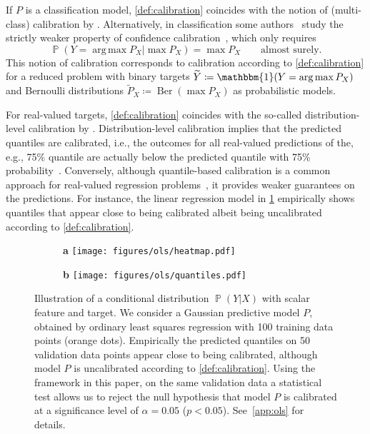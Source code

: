 \documentclass{article}
\DeclareMathOperator{\Prob}{\mathbb{P}}
\DeclareMathOperator{\Ber}{Ber}
\DeclareMathOperator{\argmax}{arg\,max}
\begin{document}
If $P$ is a classification model, \cref{def:calibration} coincides
with the notion of (multi-class) calibration by
\citet{Broecker2009,Vaicenavicius2019,Kull2019}. Alternatively, in classification
some authors~\citep{Naeini2015,Guo2017,Kumar2018} study the
strictly weaker property of confidence calibration~\citep{Kull2019},
which only requires
\begin{equation}\label{eq:calibration_confidence}
    \Prob{(Y = \argmax{P_X} | \max P_X)} = \max P_X \qquad \text{almost surely}.
\end{equation}
This notion of calibration corresponds to calibration according to \cref{def:calibration}
for a reduced problem with binary targets
$\widetilde{Y} \coloneqq \mathbbm{1}(Y = \argmax{P_X})$ and Bernoulli
distributions $\widetilde{P}_X \coloneqq \Ber(\max P_X)$ as probabilistic models.

For real-valued targets, \cref{def:calibration} coincides with the
so-called distribution-level calibration by \citet{Song2019}.
Distribution-level calibration
implies that the predicted quantiles are calibrated, i.e., the outcomes for all
real-valued predictions of the, e.g., 75\% quantile are actually below the
predicted quantile with 75\% probability~\citep[Theorem~1]{Song2019}. Conversely,
although quantile-based calibration is a
common approach for real-valued regression
problems~\citep{Ho2005,Fasiolo2020,Rueda2006,Taillardat2016,Kuleshov2018},
it provides weaker guarantees on the predictions. For instance, the
linear regression model in \cref{fig:ols_motivation} empirically shows quantiles that
appear close to being calibrated albeit being uncalibrated according to \cref{def:calibration}.

\begin{figure}[!htb]
    \centering
    \begin{subfigure}[t]{0.62\textwidth}
        \centering
        \textbf{a}
        \texttt{[image: figures/ols/heatmap.pdf]}
    \end{subfigure}%
    \hfill%
    \begin{subfigure}[t]{0.38\textwidth}
        \centering
        \textbf{b}
        \texttt{[image: figures/ols/quantiles.pdf]}
    \end{subfigure}
    \caption{Illustration of a conditional distribution $\Prob(Y|X)$ with scalar
    feature and target. We consider a Gaussian predictive model $P$, obtained by
    ordinary least squares regression with 100 training data points (orange dots).
    Empirically the predicted quantiles on 50 validation data points appear close
    to being calibrated, although model $P$ is uncalibrated according to
    \cref{def:calibration}. Using the framework in this
    paper, on the same validation data a statistical test allows us to reject
    the null hypothesis that model $P$ is calibrated at a significance level of
    $\alpha = 0.05$ ($p < 0.05$). See~\cref{app:ols} for details.}%
    \label{fig:ols_motivation}
\end{figure}
\end{document}
